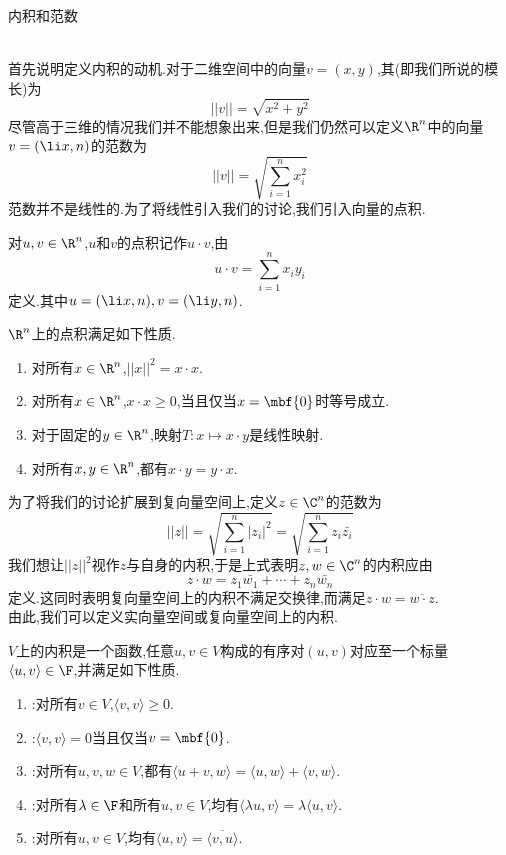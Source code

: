 \documentclass{ctexart}
\begin{document}
\pagestyle{empty}
\begin{center}\large 内积和范数\end{center}
\\
首先说明定义内积的动机.对于二维空间中的向量$v=(x,y)$,其(即我们所说的模长)为
$$||v||=\sqrt{x^2+y^2}$$
尽管高于三维的情况我们并不能想象出来,但是我们仍然可以定义$\R^n$中的向量$v=\left(\li x,n\right)$的范数为
$$||v||=\sqrt{\sum_{i=1}^{n}x_i^2}$$
范数并不是线性的.为了将线性引入我们的讨论,我们引入向量的点积.
\begin{definition}[1.1 定义:点积]
    对$u,v\in\R^n$,$u$和$v$的点积记作$u\cdot v$,由
    $$u\cdot v=\sum_{i=1}^{n}x_iy_i$$
    定义.其中$u=(\li x,n),v=(\li y,n)$.
\end{definition}\noindent
$\R^n$上的点积满足如下性质.
\begin{enumerate}[label=\tbf{(\arabic*)}]
    \item 对所有$x\in\R^n$,$||x||^2=x\cdot x$.
    \item 对所有$x\in\R^n$,$x\cdot x\geqslant 0$,当且仅当$x=\mbf{0}$时等号成立.
    \item 对于固定的$y\in\R^n$,映射$T:x\mapsto x\cdot y$是线性映射.
    \item 对所有$x,y\in\R^n$,都有$x\cdot y=y\cdot x$.
\end{enumerate}
为了将我们的讨论扩展到复向量空间上,定义$z\in\C^n$的范数为
$$||z||=\sqrt{\sum_{i=1}^n|z_i|^2}=\sqrt{\sum_{i=1}^{n}z_i\bar{z_i}}$$
我们想让$||z||^2$视作$z$与自身的内积,于是上式表明$z,w\in\C^n$的内积应由
$$z\cdot w=z_1\bar{w_1}+\cdots+z_n\bar{w_n}$$
定义.这同时表明复向量空间上的内积不满足交换律,而满足$z\cdot w=\overline{w\cdot z}$.\\
由此,我们可以定义实向量空间或复向量空间上的内积.
\begin{definition}[1.2 定义:内积]
    $V$上的内积是一个函数,任意$u,v\in V$构成的有序对$(u,v)$对应至一个标量$\langle u,v\rangle\in\F$,并满足如下性质.
    \begin{enumerate}[label=\tbf{(\arabic*)}]
        \item {}:对所有$v\in V$,$\langle v,v\rangle\geqslant 0$.
        \item {}:$\langle v,v\rangle=0$当且仅当$v=\mbf{0}$.
        \item {}:对所有$u,v,w\in V$,都有$\langle u+v,w\rangle=\langle u,w\rangle+\langle v,w\rangle$.
        \item {}:对所有$\lambda\in\F$和所有$u,v\in V$,均有$\langle\lambda u,v\rangle=\lambda\langle u,v\rangle$.
        \item {}:对所有$u,v\in V$,均有$\langle u,v\rangle=\overline{\langle v,u\rangle}$.
    \end{enumerate}
\end{definition}\noindent
\end{document}
